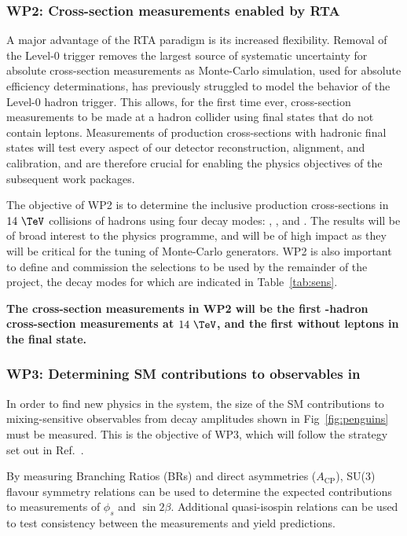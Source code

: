 \documentclass[11pt,a4paper]{article}
\begin{document}
\subsubsection{WP2: Cross-section measurements enabled by RTA}
A major advantage of the RTA paradigm is its increased flexibility. Removal of the Level-0 trigger removes the largest source of systematic uncertainty for absolute cross-section measurements as Monte-Carlo simulation, used for absolute efficiency determinations, has previously struggled to model the behavior of the Level-0 hadron trigger. This allows, for the first time ever, cross-section measurements to be made at a hadron collider using final states that do not contain leptons. 
Measurements of production cross-sections with hadronic final states will test every aspect of our detector reconstruction, alignment, and calibration, and are therefore crucial for enabling the physics objectives of the subsequent work packages.

The objective of WP2 is to determine the inclusive production cross-sections in $14~\TeV$ \pp collisions of \Pqb hadrons using four  decay modes:
\HepProcess{\PBminus\to\PDzero\Ppiminus}, 
\HepProcess{\APBzero\to\PDplus\Ppiminus}, \HepProcess{\APBs\to\PDsplus\Ppiminus} and \HepProcess{\PbgL\to\PLambdac\Ppiminus}. 
The results will be of broad interest to the \LHCb physics programme, and will be of high impact as they will be critical for the tuning of Monte-Carlo generators.
WP2 is also important to define and commission the selections to be used by the remainder of the project, the decay modes for which are indicated in Table~\ref{tab:sens}.

\textbf{The cross-section measurements in WP2 will be the first \Pqb-hadron cross-section measurements at $14~\TeV$, and the first without leptons in the final state.}

\subsubsection{WP3: Determining SM contributions to \CP observables in \HepProcess{\PB\to\PD\PD}}

In order to find new physics in the \HepProcess{\PB\to\PD\PD} system, the size of the SM contributions to mixing-sensitive observables from decay amplitudes shown in Fig~\ref{fig:penguins} must be measured. This is the objective of  WP3, which will follow the strategy set out in Ref.~\cite{Jung:2014jfa}. 

By measuring Branching Ratios (BRs) and direct \CP asymmetries ($A_{\text{CP}}$), SU(3) flavour symmetry relations can be used to determine the expected contributions to measurements of $\phi_s$ and $\sin2\beta$. Additional quasi-isospin relations can be used to test consistency between the measurements and yield predictions. 
\end{document}
